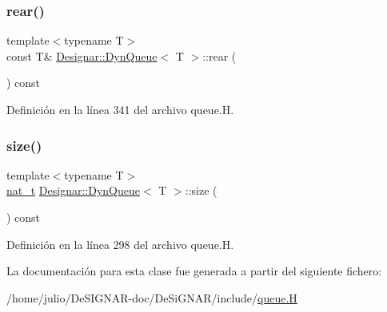 \subsubsection{\texorpdfstring{rear()}{rear()}\hspace{0.1cm}{\footnotesize\ttfamily [2/2]}}
{\footnotesize\ttfamily template$<$typename T$>$ \\
const T\& \hyperlink{class_designar_1_1_dyn_queue}{Designar\+::\+Dyn\+Queue}$<$ T $>$\+::rear (\begin{DoxyParamCaption}{ }\end{DoxyParamCaption}) const\hspace{0.3cm}{\ttfamily [inline]}}



Definición en la línea 341 del archivo queue.\+H.

\mbox{\label{class_designar_1_1_dyn_queue_a3fa0e8fd7d197de1a60caae23b5c305e}} 
\subsubsection{\texorpdfstring{size()}{size()}}
{\footnotesize\ttfamily template$<$typename T$>$ \\
\hyperlink{namespace_designar_aa72662848b9f4815e7bf31a7cf3e33d1}{nat\+\_\+t} \hyperlink{class_designar_1_1_dyn_queue}{Designar\+::\+Dyn\+Queue}$<$ T $>$\+::size (\begin{DoxyParamCaption}{ }\end{DoxyParamCaption}) const\hspace{0.3cm}{\ttfamily [inline]}}



Definición en la línea 298 del archivo queue.\+H.



La documentación para esta clase fue generada a partir del siguiente fichero\+:\begin{DoxyCompactItemize}
\item 
/home/julio/\+De\+S\+I\+G\+N\+A\+R-\/doc/\+De\+Si\+G\+N\+A\+R/include/\hyperlink{queue_8_h}{queue.\+H}\end{DoxyCompactItemize}
